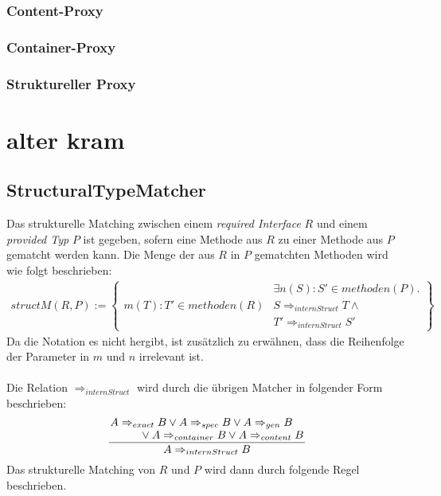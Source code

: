 \documentclass[a4paper,12pt]{article}
\begin{document}
\subsubsection{Content-Proxy}
\subsubsection{Container-Proxy}
\subsubsection{Struktureller Proxy}

\section{alter kram}
\subsection{StructuralTypeMatcher}
Das strukturelle Matching zwischen einem \emph{required Interface} $R$ und einem \emph{provided Typ} $P$ ist gegeben, sofern eine Methode aus $R$ zu einer Methode aus $P$ gematcht werden kann. Die Menge der aus $R$ in $P$ gematchten Methoden wird wie folgt beschrieben:
\begin{gather*}
structM(R,P) := \left\{ 
				\begin{array}{l|l}
						& \exists n(S):S' \in methoden(P) .\\													m(T):T' \in methoden(R) &  S\Rightarrow_{internStruct}T \wedge \\
										& T' \Rightarrow_{internStruct}S'
				\end{array}
              \right\}
\end{gather*}
Da die Notation es nicht hergibt, ist zusätzlich zu erwähnen, dass die Reihenfolge der Parameter in $m$ und $n$ irrelevant ist.\\\\
Die Relation $\Rightarrow_{internStruct}$ wird durch die übrigen Matcher in folgender Form beschrieben:
\begin{gather*}
\frac{\splitfrac{A \Rightarrow_{exact}B \vee A \Rightarrow_{spec}B 
\vee A \Rightarrow_{gen}B}{\vee A \Rightarrow_{container} B \vee A \Rightarrow_{content} B}}{A \Rightarrow_{internStruct}B}
\end{gather*}
Das strukturelle Matching von $R$ und $P$ wird dann durch folgende Regel beschrieben.
\end{document}
